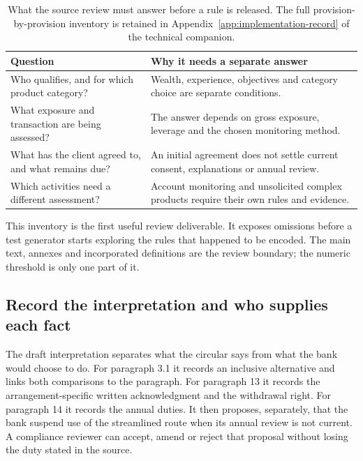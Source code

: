 
\begin{table}[H]
\centering
\caption{What the source review must answer before a rule is released. The
full provision-by-provision inventory is retained in Appendix~\ref{app:implementation-record} of the technical companion.}
\label{tab:circular-inventory-summary}
\begin{tabularx}{0.96\textwidth}{P{0.36\textwidth}Y}
\toprule
Question & Why it needs a separate answer \\ \midrule
Who qualifies, and for which product category? & Wealth, experience, objectives and category choice are separate conditions. \\
\addlinespace[0.5em]
What exposure and transaction are being assessed? & The answer depends on gross exposure, leverage and the chosen monitoring method. \\
\addlinespace[0.5em]
What has the client agreed to, and what remains due? & An initial agreement does not settle current consent, explanations or annual review. \\
\addlinespace[0.5em]
Which activities need a different assessment? & Account monitoring and unsolicited complex products require their own rules and evidence. \\
\bottomrule
\end{tabularx}
\end{table}


This inventory is the first useful review deliverable. It exposes omissions
before a test generator starts exploring the rules that happened to be encoded.
The main text, annexes and incorporated definitions are the review boundary;
the numeric threshold is only one part of it.

\subsection{Record the interpretation and who supplies each fact}
\label{merge:P-01b-complete-dry-run:03}


The draft interpretation separates what the circular says from what the bank
would choose to do. For paragraph 3.1 it records an inclusive alternative and
links both comparisons to the paragraph. For paragraph 13 it records the
arrangement-specific written acknowledgment and the withdrawal right. For
paragraph 14 it records the annual duties. It then proposes, separately, that
the bank suspend use of the streamlined route when its annual review is not
current. A compliance reviewer can accept, amend or reject that proposal
without losing the duty stated in the source.

